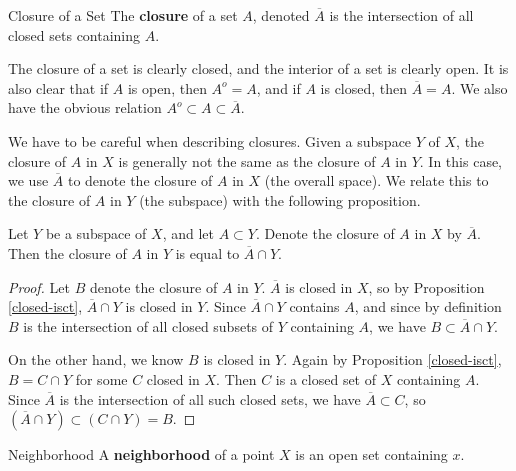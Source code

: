 \documentclass[10pt]{report}
\begin{document}
\begin{defn}{Closure of a Set}{}
	The \textbf{closure} of a set $A$, denoted $\overline{A}$ is the intersection of all closed sets containing $A$.
\end{defn}

The closure of a set is clearly closed, and the interior of a set is clearly open. It is also clear that if $A$ is open, then $A^o = A$, and if $A$ is closed, then $\overline{A}=A$. We also have the obvious relation $A^o \subset A \subset \overline{A}$.

We have to be careful when describing closures. Given a subspace $Y$ of $X$, the closure of $A$ in $X$ is generally not the same as the closure of $A$ in $Y$. In this case, we use $\overline{A}$ to denote the closure of $A$ in $X$ (the overall space). We relate this to the closure of $A$ in $Y$ (the subspace) with the following proposition.

\begin{prop}
	Let $Y$ be a subspace of $X$, and let $A \subset Y$. Denote the closure of $A$ in $X$ by $\overline{A}$. Then the closure of $A$ in $Y$ is equal to $\overline{A} \cap Y$.
\end{prop}
\begin{proof}
	Let $B$ denote the closure of $A$ in $Y$. $\overline{A}$ is closed in $X$, so by Proposition \ref{closed-isct}, $\overline{A} \cap Y$ is closed in $Y$. Since $\overline{A} \cap Y$ contains $A$, and since by definition $B$ is the intersection of all closed subsets of $Y$ containing $A$, we have $B \subset \overline{A}\cap Y$.

	On the other hand, we know $B$ is closed in $Y$. Again by Proposition \ref{closed-isct}, $B = C \cap Y$ for some $C$ closed in $X$. Then $C$ is a closed set of $X$ containing $A$. Since $\overline{A}$ is the intersection of all such closed sets, we have $\overline{A} \subset C$, so $(\overline{A} \cap Y) \subset (C \cap Y) = B$.
\end{proof}

\begin{defn}{Neighborhood}{}
A \textbf{neighborhood} of a point $X$ is an open set containing $x$.
\end{defn}
\end{document}
